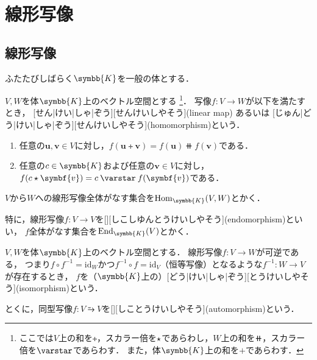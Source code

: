\documentclass[../sotsu.tex]{subfiles}
\begin{document}
\section{線形写像}
\label{sec:linear-map}

\subsection{線形写像}

ふたたびしばらく$\symbb{K}$を一般の体とする．

\begin{definition}[線形写像]
    \label{dfn:linear-map}
    $V, W$を体$\symbb{K}$上のベクトル空間とする
    \footnote{ここでは$V$上の和を$\tplus$，スカラー倍を$\mathbin{\star}$であらわし，$W$上の和を$\doubleplus$，スカラー倍を$\scaprodvar$であらわす．
    また，体$\symbb{K}$上の和を$+$であらわす．}．
    写像$f \colon V \to W$が以下を満たすとき，
    [せん|けい|しゃ|ぞう][せんけいしやそう](linear map)
    あるいは
    [じゅん|どう|けい|しゃ|ぞう][せんけいしやそう](homomorphism)という\cite[\S 2.1]{saito-lin-2007}．
    \begin{enumerate}
        \item 任意の$\symbf{u}, \symbf{v} \in V$に対し，$f(\symbf{u} \tplus \symbf{v}) = f(\symbf{u}) \doubleplus f(\symbf{v})$である．
        \item 任意の$c \in \symbb{K}$および任意の$\symbf{v} \in V$に対し，$f(c \scaprod \symbf{v}) = c \scaprodvar f(\symbf{v})$である．
    \end{enumerate}
    $V$から$W$への線形写像全体がなす集合を$\mathrm{Hom}_{\symbb{K}}(V, W)$とかく\cite[\S 4.4]{saito-lin-2007}．

    特に，線形写像$f \colon V \to V$を[][しこしゆんとうけいしやそう](endomorphism)といい，
    $f$全体がなす集合を$\mathrm{End}_{\symbb{K}}(V)$とかく\cite[\S 2.1, \S 4.4]{saito-lin-2007}．
\end{definition}


\begin{definition}[同型写像]
    \label{dfn:isomorphism}
    $V, W$を体$\symbb{K}$上のベクトル空間とする．
    線形写像$f \colon V \to W$が可逆である，
    つまり$f \circ f^{-1} = \mathrm{id}_W$かつ$f^{-1} \circ f = \mathrm{id}_V$（恒等写像）となるような$f^{-1} \colon W \to V$が存在するとき，
    $f$を（$\symbb{K}$上の）[どう|けい|しゃ|ぞう][とうけいしやそう](isomorphism)という．

    とくに，同型写像$f \colon V \similarrightarrow V$を[][しことうけいしやそう](automorphism)という\cite[\S 2.1]{saito-lin-2007}．
\end{definition}
\end{document}
